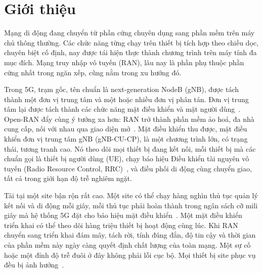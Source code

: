 \chapter{Giới thiệu}

Mạng di động đang chuyển từ phần cứng chuyên dụng sang phần mềm trên máy chủ thông thường.
Các chức năng từng chạy trên thiết bị tích hợp theo chiều dọc, chuyên biệt cố định, nay được
tái hiện thực thành chương trình trên máy tính đa mục đích. Mạng truy nhập vô tuyến (RAN),
lâu nay là phần phụ thuộc phần cứng nhất trong ngăn xếp, cũng nằm trong xu hướng đó.

Trong 5G, trạm gốc, tên chuẩn là next-generation NodeB (gNB), được tách thành một đơn vị
trung tâm và một hoặc nhiều đơn vị phân tán. Đơn vị trung tâm lại được tách thành các chức
năng mặt điều khiển và mặt người dùng~\cite{3gpp38401,3gpp38300}. Open-RAN đẩy cùng ý tưởng
xa hơn: RAN trở thành phần mềm ảo hoá, đa nhà cung cấp, nối với nhau qua giao diện
mở~\cite{polese2023oran}. Mặt điều khiển thu được, mặt điều khiển đơn vị trung tâm gNB
(gNB-CU-CP), là một chương trình lớn, có trạng thái, tương tranh cao. Nó theo dõi mọi thiết bị
đang kết nối, mỗi thiết bị mà các chuẩn gọi là thiết bị người dùng (UE), chạy báo hiệu Điều
khiển tài nguyên vô tuyến (Radio Resource Control, RRC)~\cite{3gpp38331}, và điều phối di
động cùng chuyển giao, tất cả trong giới hạn độ trễ nghiêm ngặt.


Tải tại một site bận rộn rất cao. Một site có thể chạy hàng nghìn thủ tục quản lý kết nối và
di động mỗi giây, mỗi thủ tục phải hoàn thành trong ngân sách cỡ mili giây mà hệ thống 5G đặt
cho báo hiệu mặt điều khiển~\cite{3gpp38913}. Một mặt điều khiển triển khai có thể theo dõi
hàng triệu thiết bị hoạt động cùng lúc. Khi RAN chuyển sang triển khai đám mây, tách rời, tính
đúng đắn, độ tin cậy và thời gian của phần mềm này ngày càng quyết định chất lượng của toàn
mạng. Một sự cố hoặc một đỉnh độ trễ đuôi ở đây không phải lỗi cục bộ. Mọi thiết bị site phục
vụ đều bị ảnh hưởng~\cite{dean2013tail,barroso2017microseconds}.


